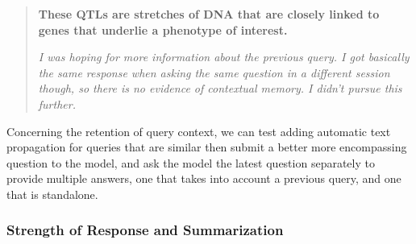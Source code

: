 \begin{quotation}

\textbf{These QTLs are stretches of DNA that are closely linked to genes that underlie a phenotype of interest.} 

\textit{I was hoping for more information about the previous query. I got basically the same response when asking the same question in a different session though, so there is no evidence of contextual memory. I didn’t pursue this further.}
\end{quotation}

Concerning the retention of query context, we can test adding automatic text propagation for queries that are similar then submit a better more encompassing question to the model, and ask the model the latest question separately to provide multiple answers, one that takes into account a previous query, and one that is standalone.

\subsubsection{Strength of Response and Summarization}

